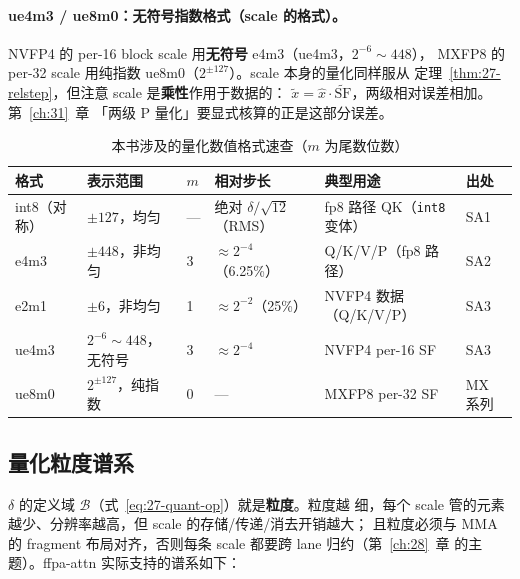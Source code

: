 \paragraph{ue4m3 / ue8m0：无符号指数格式（scale 的格式）。}
NVFP4 的 per-16 block scale 用\textbf{无符号} e4m3（ue4m3，$2^{-6} \sim 448$），
MXFP8 的 per-32 scale 用纯指数 ue8m0（$2^{\pm127}$）。scale 本身的量化同样服从
定理~\ref{thm:27-relstep}，但注意 scale 是\textbf{乘性}作用于数据的：
$\tilde{x} = \hat{x} \cdot \widetilde{\mathrm{SF}}$，两级相对误差相加。第~\ref{ch:31}~章
「两级 P 量化」要显式核算的正是这部分误差。

\begin{table}[htbp]
  \centering
  \caption{本书涉及的量化数值格式速查（$m$ 为尾数位数）}
  \label{tab:27-formats}
  \begin{tabular}{llllll}
    \toprule
    格式 & 表示范围 & $m$ & 相对步长 & 典型用途 & 出处 \\
    \midrule
    int8（对称） & $\pm127$，均匀 & — & 绝对 $\delta/\sqrt{12}$（RMS） & fp8 路径 QK（\texttt{int8} 变体） & SA1 \\
    e4m3 & $\pm448$，非均匀 & 3 & $\approx 2^{-4}$（6.25\%） & Q/K/V/P（fp8 路径） & SA2 \\
    e2m1 & $\pm 6$，非均匀 & 1 & $\approx 2^{-2}$（25\%） & NVFP4 数据（Q/K/V/P） & SA3 \\
    ue4m3 & $2^{-6}\sim448$，无符号 & 3 & $\approx 2^{-4}$ & NVFP4 per-16 SF & SA3 \\
    ue8m0 & $2^{\pm127}$，纯指数 & 0 & — & MXFP8 per-32 SF & MX 系列 \\
    \bottomrule
  \end{tabular}
\end{table}

\subsection{量化粒度谱系}

$\delta$ 的定义域 $\mathcal{B}$（式~\ref{eq:27-quant-op}）就是\textbf{粒度}。粒度越
细，每个 scale 管的元素越少、分辨率越高，但 scale 的存储/传递/消去开销越大；
且粒度必须与 MMA 的 fragment 布局对齐，否则每条 scale 都要跨 lane 归约（第~\ref{ch:28}~章
的主题）。ffpa-attn 实际支持的谱系如下：

